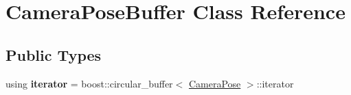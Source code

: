 \hypertarget{class_camera_pose_buffer}{\section{Camera\-Pose\-Buffer Class Reference}
\label{class_camera_pose_buffer}
}
\subsection*{Public Types}
\begin{DoxyCompactItemize}
\item 
\hypertarget{class_camera_pose_buffer_a91a3420732c8d8339a8b1dfe7a6e63d3}{using {\bfseries iterator} = boost\-::circular\-\_\-buffer$<$ \hyperlink{class_camera_pose}{Camera\-Pose} $>$\-::iterator}\label{class_camera_pose_buffer_a91a3420732c8d8339a8b1dfe7a6e63d3}

\end{DoxyCompactItemize}
